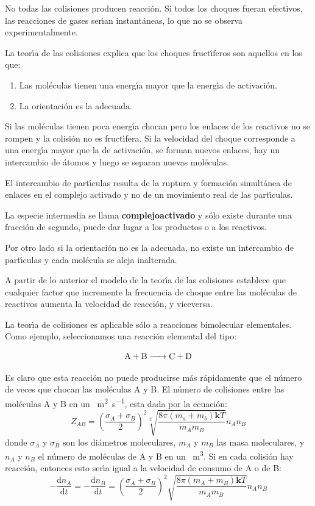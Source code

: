 No todas las colisiones producen reacci\'on. Si todos los choques fueran efectivos, las reacciones de gases ser\'{\i}an instant\'aneas, lo que no se observa experimentalmente.

La teor\'{\i}a de las colisiones explica que los choques  fruct\'{\i}feros son aquellos en los que:
\begin{enumerate}
\item Las mol\'eculas tienen una energ\'{\i}a mayor que la
energ\'{\i}a de activaci\'on.
\item La orientaci\'on es la adecuada.
\end{enumerate}
Si las mol\'eculas tienen poca energ\'{\i}a chocan pero los enlaces de los reactivos no se rompen y la colisi\'on no es fruct\'{\i}fera. Si la velocidad del choque corresponde a una energ\'{\i}a mayor que la de activaci\'on, se forman nuevos enlaces, hay un intercambio de \'atomos y luego se separan nuevas mol\'e\-culas.

El intercambio de part\'{\i}culas resulta de la ruptura y formaci\'on simult\'a\-nea de enlaces en el complejo
activado y no de un movimiento real de las part\'{\i}culas.

La especie intermedia se llama \textbf{\gls{complejoactivado}}
y s\'olo existe durante una fracci\'on de segundo, puede dar
lugar a los productos o a los reactivos.

Por otro lado si la orientaci\'on no es la adecuada, no existe un intercambio de part\'{\i}culas y cada mol\'ecula se aleja inalterada.

A partir de lo anterior el modelo de la teor\'{\i}a de las colisiones establece que cualquier factor que incremente la frecuencia de choque entre las mo\-l\'e\-culas de reactivos aumenta la velocidad de reacci\'on, y viceversa.

La teor\'{\i}a de colisiones es aplicable s\'olo a reacciones bimolecular elementales. Como ejemplo, seleccionamos una reacci\'on elemental del tipo:

$$\ce{A + B -> C + D}$$

Es claro que esta reacci\'on no puede producirse m\'as r\'apidamente que el n\'umero de veces que chocan las mol\'eculas A y B. El n\'umero de colisiones entre las mol\'eculas A y B en un \si{\centi\square\metre\per\second}, esta dada por la ecuaci\'on:
\begin{equation}
 Z_{AB}= \left( \frac{ \sigma_A+ \sigma_B }{2}\right)^2 \sqrt[2]{\frac{8 \pi(m_a+m_b)\textbf{k}T }{m_Am_B}} n_An_B 
\end{equation}
donde $\sigma_A$ y $\sigma_B$  son los di\'ametros moleculares, $m_A$ y $m_B$ las masa moleculares, y $n_A$ y $n_B$ el n\'umero de mol\'eculas de A y B en un \si{\centi\cubic\metre}. Si en cada colisi\'on hay reacci\'on, entonces esto ser\'{\i}a igual a la velocidad de consumo de A o de B:
\begin{equation}
 -\frac{\mathrm{d}n_A}{\mathrm{d}t}=-\frac{\mathrm{d}n_B}{\mathrm{d}t}=\left(\frac{ \sigma_A+ \sigma_B }{ 2 }\right)^2 \sqrt{\frac{8 \pi(m_A+m_B)\textbf{k}T }{m_Am_B}}n_An_B 
\end{equation}


